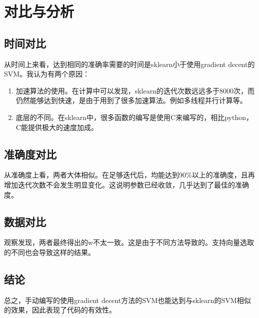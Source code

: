 \documentclass[UTF8]{ctexart}
\begin{document}
\section{对比与分析}
\subsection{时间对比}
从时间上来看，达到相同的准确率需要的时间是sklearn小于使用gradient decent的SVM。我认为有两个原因：
\begin{enumerate}
    \item 加速算法的使用。在计算中可以发现，sklearn的迭代次数远远多于8000次，而仍然能够达到快速，是由于用到了很多加速算法。例如多线程并行计算等。
    \item 底层的不同。在sklearn中，很多函数的编写是使用C来编写的，相比python，C能提供极大的速度加成。
\end{enumerate}
\subsection{准确度对比}
从准确度上看，两者大体相似。在足够迭代后，均能达到90\%以上的准确度，且再增加迭代次数不会发生明显变化。这说明参数已经收敛，几乎达到了最佳的准确度。
\subsection{数据对比}
观察发现，两者最终得出的w不太一致。这是由于不同方法导致的。支持向量选取的不同也会导致这样的结果。
\subsection{结论}
总之，手动编写的使用gradient decent方法的SVM也能达到与sklearn的SVM相似的效果，因此表现了代码的有效性。

\end{document}
